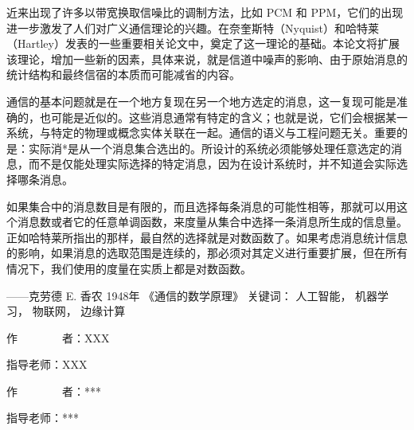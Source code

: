 \begin{cabstract}
	近来出现了许多以带宽换取信噪比的调制方法，比如 PCM 和 PPM，它们的出现进一步激发了人们对广义通信理论的兴趣。在奈奎斯特（Nyquist）和哈特莱（Hartley）发表的一些重要相关论文中，奠定了这一理论的基础。本论文将扩展该理论，增加一些新的因素，具体来说，就是信道中噪声的影响、由于原始消息的统计结构和最终信宿的本质而可能减省的内容。

	通信的基本问题就是在一个地方复现在另一个地方选定的消息，这一复现可能是准确的，也可能是近似的。这些消息通常有特定的含义；也就是说，它们会根据某一系统，与特定的物理或概念实体关联在一起。通信的语义与工程问题无关。重要的是：实际消*是从一个消息集合选出的。所设计的系统必须能够处理任意选定的消息，而不是仅能处理实际选择的特定消息，因为在设计系统时，并不知道会实际选择哪条消息。

	如果集合中的消息数目是有限的，而且选择每条消息的可能性相等，那就可以用这个消息数或者它的任意单调函数，来度量从集合中选择一条消息所生成的信息量。正如哈特莱所指出的那样，最自然的选择就是对数函数了。如果考虑消息统计信息的影响，如果消息的选取范围是连续的，那必须对其定义进行重要扩展，但在所有情况下，我们使用的度量在实质上都是对数函数。

	——克劳德 E. 香农 1948年 《通信的数学原理》
	\vskip 21bp
		{\heiti{} 关键词：}
	人工智能，
	机器学习，
	物联网，
	边缘计算

\end{cabstract}

\iffinalversion
	\begin{flushright}
		作~~~~~~~~者：XXX

		指导老师：XXX
	\end{flushright}
\else
	\begin{flushright}
		作~~~~~~~~者：***

		指导老师：***
	\end{flushright}
\fi
